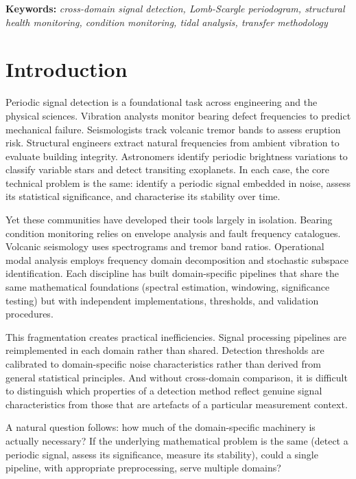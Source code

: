 \documentclass[11pt,a4paper]{article}
\begin{document}
\noindent\textbf{Keywords:} \textit{cross-domain signal detection, Lomb-Scargle periodogram, structural health monitoring, condition monitoring, tidal analysis, transfer methodology}

\section{Introduction}
\label{sec:introduction}

Periodic signal detection is a foundational task across engineering and the physical sciences. Vibration analysts monitor bearing defect frequencies to predict mechanical failure. Seismologists track volcanic tremor bands to assess eruption risk. Structural engineers extract natural frequencies from ambient vibration to evaluate building integrity. Astronomers identify periodic brightness variations to classify variable stars and detect transiting exoplanets. In each case, the core technical problem is the same: identify a periodic signal embedded in noise, assess its statistical significance, and characterise its stability over time.

Yet these communities have developed their tools largely in isolation. Bearing condition monitoring relies on envelope analysis and fault frequency catalogues. Volcanic seismology uses spectrograms and tremor band ratios. Operational modal analysis employs frequency domain decomposition and stochastic subspace identification. Each discipline has built domain-specific pipelines that share the same mathematical foundations (spectral estimation, windowing, significance testing) but with independent implementations, thresholds, and validation procedures.

This fragmentation creates practical inefficiencies. Signal processing pipelines are reimplemented in each domain rather than shared. Detection thresholds are calibrated to domain-specific noise characteristics rather than derived from general statistical principles. And without cross-domain comparison, it is difficult to distinguish which properties of a detection method reflect genuine signal characteristics from those that are artefacts of a particular measurement context.

A natural question follows: how much of the domain-specific machinery is actually necessary? If the underlying mathematical problem is the same (detect a periodic signal, assess its significance, measure its stability), could a single pipeline, with appropriate preprocessing, serve multiple domains?
\end{document}
